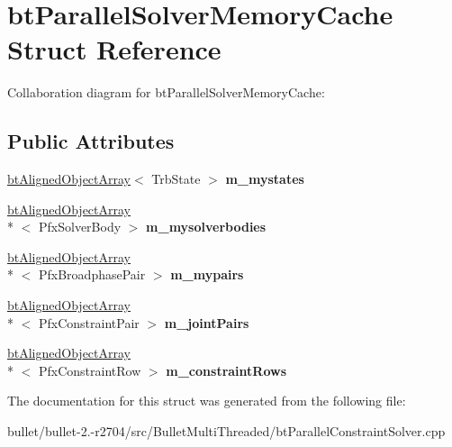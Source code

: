 \hypertarget{structbt_parallel_solver_memory_cache}{\section{bt\+Parallel\+Solver\+Memory\+Cache Struct Reference}
\label{structbt_parallel_solver_memory_cache}
}


Collaboration diagram for bt\+Parallel\+Solver\+Memory\+Cache\+:
\subsection*{Public Attributes}
\begin{DoxyCompactItemize}
\item 
\hypertarget{structbt_parallel_solver_memory_cache_a7262d65e67cce8c2c9e703f67fbb0e37}{\hyperlink{classbt_aligned_object_array}{bt\+Aligned\+Object\+Array}$<$ Trb\+State $>$ {\bfseries m\+\_\+mystates}}\label{structbt_parallel_solver_memory_cache_a7262d65e67cce8c2c9e703f67fbb0e37}

\item 
\hypertarget{structbt_parallel_solver_memory_cache_af19ee1eba37ebf1458b90fd9f3deff09}{\hyperlink{classbt_aligned_object_array}{bt\+Aligned\+Object\+Array}\\*
$<$ Pfx\+Solver\+Body $>$ {\bfseries m\+\_\+mysolverbodies}}\label{structbt_parallel_solver_memory_cache_af19ee1eba37ebf1458b90fd9f3deff09}

\item 
\hypertarget{structbt_parallel_solver_memory_cache_a2685ed32fc69a74baa3d35820ea508c2}{\hyperlink{classbt_aligned_object_array}{bt\+Aligned\+Object\+Array}\\*
$<$ Pfx\+Broadphase\+Pair $>$ {\bfseries m\+\_\+mypairs}}\label{structbt_parallel_solver_memory_cache_a2685ed32fc69a74baa3d35820ea508c2}

\item 
\hypertarget{structbt_parallel_solver_memory_cache_a250f57f0f5f3e09a374f54aef3483a00}{\hyperlink{classbt_aligned_object_array}{bt\+Aligned\+Object\+Array}\\*
$<$ Pfx\+Constraint\+Pair $>$ {\bfseries m\+\_\+joint\+Pairs}}\label{structbt_parallel_solver_memory_cache_a250f57f0f5f3e09a374f54aef3483a00}

\item 
\hypertarget{structbt_parallel_solver_memory_cache_a92c67b698d207c731fbb7e03b433da12}{\hyperlink{classbt_aligned_object_array}{bt\+Aligned\+Object\+Array}\\*
$<$ Pfx\+Constraint\+Row $>$ {\bfseries m\+\_\+constraint\+Rows}}\label{structbt_parallel_solver_memory_cache_a92c67b698d207c731fbb7e03b433da12}

\end{DoxyCompactItemize}


The documentation for this struct was generated from the following file\+:\begin{DoxyCompactItemize}
\item 
bullet/bullet-\/2.-\/r2704/src/\+Bullet\+Multi\+Threaded/bt\+Parallel\+Constraint\+Solver.\+cpp\end{DoxyCompactItemize}

